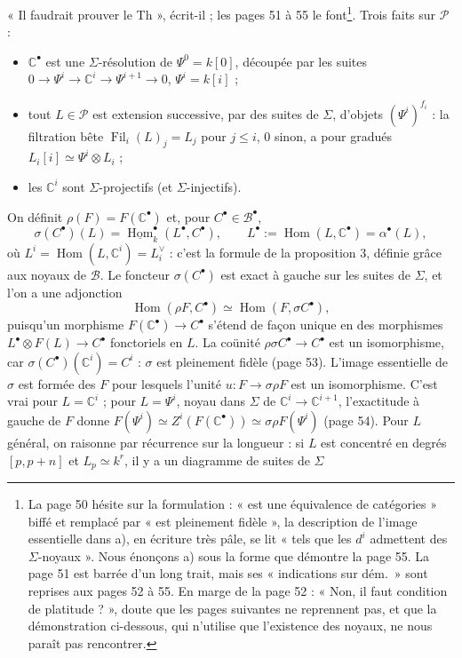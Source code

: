 \documentclass[11pt,a4paper]{article}
\begin{document}
« Il faudrait prouver le Th », écrit-il ; les pages 51 à 55 le
font\footnote{La page 50 hésite sur la formulation : « est une équivalence
de catégories » biffé et remplacé par « est pleinement fidèle », la
description de l'image essentielle dans a), en écriture très pâle, se lit
« tels que les $d^{i}$ admettent des $\Sigma$-noyaux ». Nous énonçons a)
sous la forme que démontre la page 55. La page 51 est barrée d'un long
trait, mais ses « indications sur dém.\ » sont reprises aux pages 52 à 55.
En marge de la page 52 : « Non, il faut condition de platitude ? », doute que les pages suivantes ne reprennent pas, et que la démonstration
ci-dessous, qui n'utilise que l'existence des noyaux, ne nous paraît pas
rencontrer.}. Trois faits sur $\mathcal{P}$ :
\begin{itemize}
\item $\mathbb{C}^{\bullet}$ est une $\Sigma$-résolution de
$\Psi^{0} = k[0]$, découpée par les suites $0 \to \Psi^{i} \to
\mathbb{C}^{i} \to \Psi^{i+1} \to 0$, $\Psi^{i} = k[i]$ ;
\item tout $L \in \mathcal{P}$ est extension successive, par des suites de
$\Sigma$, d'objets $(\Psi^{i})^{f_{i}}$ : la filtration bête
$\operatorname{Fil}_{i}(L)_{j} = L_{j}$ pour $j \leqslant i$, $0$ sinon, a
pour gradués $L_{i}[i] \simeq \Psi^{i} \otimes L_{i}$ ;
\item les $\mathbb{C}^{i}$ sont $\Sigma$-projectifs (et
$\Sigma$-injectifs).
\end{itemize}
On définit $\rho(F) = F(\mathbb{C}^{\bullet})$ et, pour $C^{\bullet} \in
\mathcal{B}^{\bullet}$,
\[
  \sigma(C^{\bullet})(L) = \underline{\operatorname{Hom}}^{\bullet}_{k}(L^{\bullet},
  C^{\bullet}), \qquad L^{\bullet} := \operatorname{Hom}(L,
  \mathbb{C}^{\bullet}) = \alpha^{\bullet}(L),
\]
où $L^{i} = \operatorname{Hom}(L, \mathbb{C}^{i}) = L_{i}^{\vee}$ : c'est la
formule de la proposition 3, définie grâce aux noyaux de $\mathcal{B}$. Le
foncteur $\sigma(C^{\bullet})$ est exact à gauche sur les suites de $\Sigma$,
et l'on a une adjonction
\[
  \operatorname{Hom}(\rho F, C^{\bullet}) \simeq \operatorname{Hom}(F,
  \sigma C^{\bullet}),
\]
puisqu'un morphisme $F(\mathbb{C}^{\bullet}) \to C^{\bullet}$ s'étend de
façon unique en des morphismes $L^{\bullet} \otimes F(L) \to C^{\bullet}$
fonctoriels en $L$. La coünité $\rho\sigma C^{\bullet} \to C^{\bullet}$ est
un isomorphisme, car $\sigma(C^{\bullet})(\mathbb{C}^{i}) = C^{i}$ : $\sigma$
est pleinement fidèle (page 53). L'image essentielle de $\sigma$ est formée
des $F$ pour lesquels l'unité $u : F \to \sigma\rho F$ est un isomorphisme.
C'est vrai pour $L = \mathbb{C}^{i}$ ; pour $L = \Psi^{i}$, noyau dans
$\Sigma$ de $\mathbb{C}^{i} \to \mathbb{C}^{i+1}$, l'exactitude à gauche de
$F$ donne $F(\Psi^{i}) \simeq Z^{i}(F(\mathbb{C}^{\bullet})) \simeq
\sigma\rho F(\Psi^{i})$ (page 54). Pour $L$ général, on raisonne par
récurrence sur la longueur : si $L$ est concentré en degrés $[p, p+n]$ et
$L_{p} \simeq k^{r}$, il y a un diagramme de suites de $\Sigma$
\end{document}
